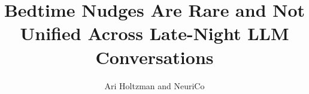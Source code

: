 \documentclass{article}
\title{Bedtime Nudges Are Rare and Not Unified Across Late-Night LLM Conversations}
\author{Ari Holtzman and NeuriCo}
\begin{document}
\maketitle

\begin{abstract}

\end{abstract}









\end{document}
